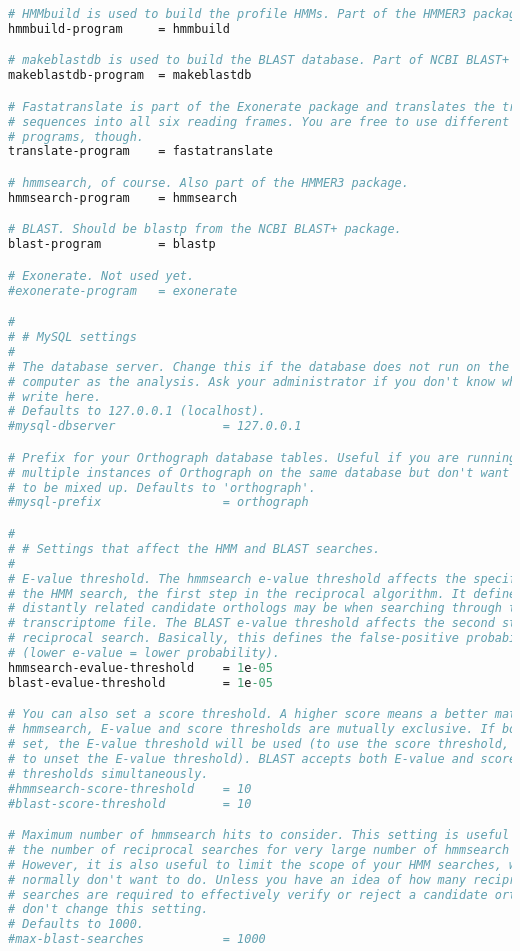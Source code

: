 \begin{lstlisting}[language=perl]
# HMMbuild is used to build the profile HMMs. Part of the HMMER3 package.
hmmbuild-program     = hmmbuild

# makeblastdb is used to build the BLAST database. Part of NCBI BLAST+
makeblastdb-program  = makeblastdb

# Fastatranslate is part of the Exonerate package and translates the transcript
# sequences into all six reading frames. You are free to use different
# programs, though.
translate-program    = fastatranslate

# hmmsearch, of course. Also part of the HMMER3 package.
hmmsearch-program    = hmmsearch

# BLAST. Should be blastp from the NCBI BLAST+ package.
blast-program        = blastp

# Exonerate. Not used yet.
#exonerate-program   = exonerate

#
# # MySQL settings
#
# The database server. Change this if the database does not run on the same
# computer as the analysis. Ask your administrator if you don't know what to
# write here.
# Defaults to 127.0.0.1 (localhost).
#mysql-dbserver               = 127.0.0.1

# Prefix for your Orthograph database tables. Useful if you are running
# multiple instances of Orthograph on the same database but don't want the data
# to be mixed up. Defaults to 'orthograph'.
#mysql-prefix                 = orthograph

#
# # Settings that affect the HMM and BLAST searches.
#
# E-value threshold. The hmmsearch e-value threshold affects the specificity of
# the HMM search, the first step in the reciprocal algorithm. It defines how
# distantly related candidate orthologs may be when searching through the
# transcriptome file. The BLAST e-value threshold affects the second step, the
# reciprocal search. Basically, this defines the false-positive probability
# (lower e-value = lower probability).
hmmsearch-evalue-threshold    = 1e-05
blast-evalue-threshold        = 1e-05

# You can also set a score threshold. A higher score means a better match. For
# hmmsearch, E-value and score thresholds are mutually exclusive. If both are
# set, the E-value threshold will be used (to use the score threshold, you have
# to unset the E-value threshold). BLAST accepts both E-value and score
# thresholds simultaneously.
#hmmsearch-score-threshold	  = 10
#blast-score-threshold        = 10

# Maximum number of hmmsearch hits to consider. This setting is useful to limit
# the number of reciprocal searches for very large number of hmmsearch hits.
# However, it is also useful to limit the scope of your HMM searches, which you
# normally don't want to do. Unless you have an idea of how many reciprocal
# searches are required to effectively verify or reject a candidate ortholog,
# don't change this setting. 
# Defaults to 1000.
#max-blast-searches           = 1000


\end{lstlisting}
